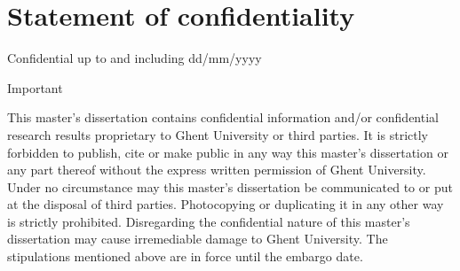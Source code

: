 \chapter*{Statement of confidentiality}

Confidential up to and including  dd/mm/yyyy

Important

This master’s dissertation contains confidential information and/or confidential research results proprietary to Ghent University or third parties. It is strictly forbidden to publish, cite or make public in any way this master’s dissertation or any part thereof without the express written permission of Ghent University. Under no circumstance may this master’s dissertation be communicated to or put at the disposal of third parties. Photocopying or duplicating it in any other way is strictly prohibited. Disregarding the confidential nature of this master’s dissertation may cause irremediable damage to Ghent University. The stipulations mentioned above are in force until the embargo date.

%
%
%
